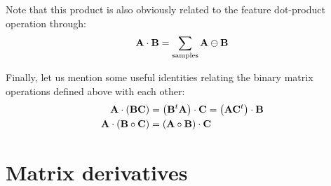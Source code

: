 \documentclass{article}
\begin{document}
\begin{appendices}
\noindent Note that this product is also obviously related to the feature dot-product operation through:
\begin{equation}
{\bf A} \cdot {\bf B} = \sum_\text{samples} {\bf A} \ominus {\bf B}
\label{rowWise::Froebenius}
\end{equation}

\noindent Finally, let us mention some useful identities relating the binary matrix operations defined above with each other:
\begin{align}
{\bf A} \cdot \left( {\bf B} {\bf C} \right) &= \left( {\bf B}^t {\bf A} \right) \cdot {\bf C} = \left( {\bf A} {\bf C}^t \right) \cdot {\bf B}
\label{frobenius1} \\
{\bf A} \cdot \left( {\bf B} \circ {\bf C} \right) &= \left( {\bf A} \circ {\bf B} \right) \cdot {\bf C}
\label{frobenius2}
\end{align}

\section{Matrix derivatives}


\end{appendices}
\end{document}
